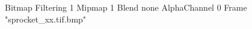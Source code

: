{Bitmap
	{Filtering 1}
	{Mipmap 1}
	{Blend none}
	{AlphaChannel 0}
	{Frame "sprocket_xx.tif.bmp"}
}
